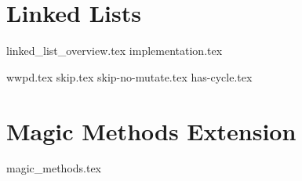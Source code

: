 \documentclass{exam}
\begin{document}
\newpage
\section{Linked Lists}
{linked_list_overview.tex}
{implementation.tex}
\begin{questions}
{wwpd.tex}
{skip.tex}
{skip-no-mutate.tex}
{has-cycle.tex}
\end{questions}

\section{Magic Methods Extension}
{magic_methods.tex}
\end{document}
